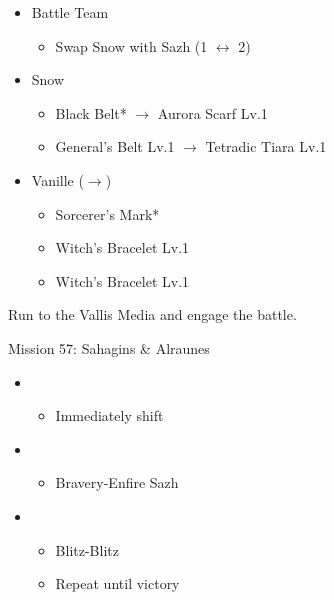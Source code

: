 \begin{menu}
	\begin{itemize}
	\paradigm
		\begin{itemize}
			\item Battle Team
				\begin{itemize}
					\item Swap Snow with Sazh (1 $\leftrightarrow$ 2)
				\end{itemize}
		\end{itemize}
	\equip
		\begin{itemize}
			\item Snow
				\begin{itemize}
					\item Black Belt* $\rightarrow$ Aurora Scarf Lv.1
					\item General's Belt Lv.1 $\rightarrow$ Tetradic Tiara Lv.1
				\end{itemize}
			\item Vanille ($\rightarrow$)
				\begin{itemize}
					\item Sorcerer's Mark*
					\item Witch's Bracelet Lv.1
					\item Witch's Bracelet Lv.1
				\end{itemize}
		\end{itemize}
	\end{itemize}
\end{menu}

Run to the Vallis Media and engage the battle.

\begin{battle}{Mission 57: Sahagins \& Alraunes}
	\begin{itemize}
		\item \sixth
			\begin{itemize}
				\item Immediately shift
			\end{itemize}
		\item \fifth
			\begin{itemize}
				\item Bravery-Enfire Sazh
			\end{itemize}
		\item \first
			\begin{itemize}
				\item Blitz-Blitz
				\item Repeat until victory
			\end{itemize}
	\end{itemize}
\end{battle}

